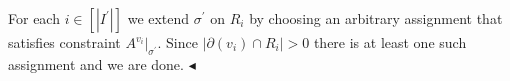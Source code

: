 For each $i\in[|I^{\prime}|]$ we extend $\sigma^{\prime}$ on $R_{i}$ by choosing an arbitrary assignment that satisfies
constraint $A^{v_{i}}|_{\sigma^{\prime}}$. Since $|\partial(v_{i})\cap R_{i}|>0$ there is at least one such assignment and we are
done.
$\blacktriangleleft$\par




\par



